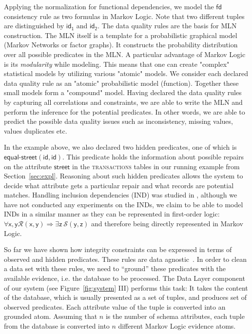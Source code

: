 Applying the normalization for functional dependencies, we model the $\mathsf{fd}$ consistency rule as two formulas in Markov Logic. 
Note that two different tuples are distinguished by $\mathsf{id_1}$ and $\mathsf{id_2}$. 
The data quality rules are the basis for MLN construction. The MLN itself is a template for a probabilistic graphical model (Markov Networks or factor graphs). It constructs the probability distribution over all possible predicates in the MLN. A particular advantage of Markov Logic is its \textit{modularity} while modeling. This means that one can create "complex" statistical models by utilizing various "atomic" models. We consider each declared data quality rule as an "atomic" probabilistic model
(function). Together these small models form a "compound" model. Having declared the data quality rules by capturing all correlations and
constraints, we are able to write the MLN and perform the inference for the potential predicates. In other words, we are able to predict the 
possible data quality issues such as inconsistency, missing values, values duplicates etc. 

In the example above, we also declared two hidden predicates, one of which is $\mathsf{\textsf{equal-street}(id, id)}$. This predicate holds the information about possible repairs 
on the attribute $\mathsf{\textsf{street}}$ in the \textsc{transactions} tables in our running example from Section~\ref{sec:expl}.
Reasoning about such hidden predicates allows the system to decide what attribute gets a particular repair and what records are potential matches. 
Handling inclusion dependencies (IND) was studied in \cite{bohannon2005cost}, although we have not conducted any experiments on the INDs, we claim to be able to model INDs in a similar manner as they can be represented in first-order logic: $\mathsf{\forall x, y\mathcal{R}(x, y) \Rightarrow \exists z~\mathcal{S}(y, z)} $ and therefore being directly represented in Markov Logic.

So far we have shown how integrity constraints can be expressed in terms of observed and hidden predicates. 
These rules are data agnostic~\cite{fan2012foundations}. In order to clean a data set with these rules, we need to ``ground'' these predicates with the 
available evidence, i.e. the database to be processed. The Data Layer component of our system (see Figure~\ref{fig:system} III) performs this task: It takes
the content of the database, which is usually presented as a set of tuples, and produces set of observed predicates. Each attribute value of the tuple is converted into an grounded atom. Assuming that $n$ is the number of schema attributes, each tuple from the database is converted into $n$ different Markov Logic evidence atoms.

